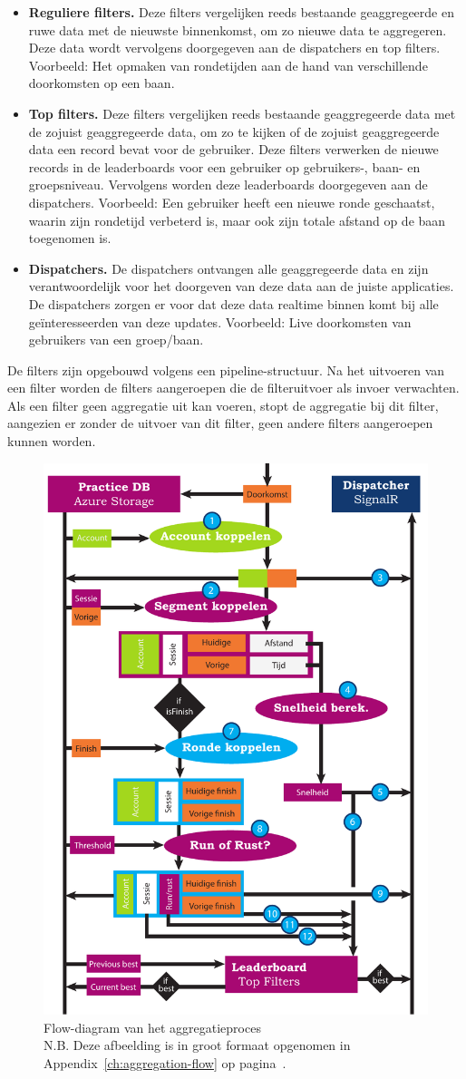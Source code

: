 \begin{itemize}
\item \textbf{Reguliere filters.}
Deze filters vergelijken reeds bestaande geaggregeerde en ruwe data met de nieuwste binnenkomst, om zo nieuwe data te aggregeren. Deze data wordt vervolgens doorgegeven aan de dispatchers en top filters. Voorbeeld: Het opmaken van rondetijden aan de hand van verschillende doorkomsten op een baan.
\item \textbf{Top filters.}
Deze filters vergelijken reeds bestaande geaggregeerde data met de zojuist geaggregeerde data, om zo te kijken of de zojuist geaggregeerde data een record bevat voor de gebruiker. Deze filters verwerken de nieuwe records in de leaderboards voor een gebruiker op gebruikers-, baan- en groepsniveau. Vervolgens worden deze leaderboards doorgegeven aan de dispatchers. Voorbeeld: Een gebruiker heeft een nieuwe ronde geschaatst, waarin zijn rondetijd verbeterd is, maar ook zijn totale afstand op de baan toegenomen is. 
\item \textbf{Dispatchers.}
De dispatchers ontvangen alle geaggregeerde data en zijn verantwoordelijk voor het doorgeven van deze data aan de juiste applicaties. De dispatchers zorgen er voor dat deze data realtime binnen komt bij alle geïnteresseerden van deze updates. 
Voorbeeld: Live doorkomsten van gebruikers van een groep/baan. 
\end{itemize}

De filters zijn opgebouwd volgens een pipeline-structuur. Na het uitvoeren van een filter worden de filters aangeroepen die de filteruitvoer als invoer verwachten. Als een filter geen aggregatie uit kan voeren, stopt de aggregatie bij dit filter, aangezien er zonder de uitvoer van dit filter, geen andere filters aangeroepen kunnen worden. 

\begin{figure}[h]
  \begin{center}
    \includegraphics[width=.4\textwidth]{style/images/Aggregatie-flow}
  \end{center}
  \caption{Flow-diagram van het aggregatieproces \\ N.B. Deze afbeelding is in groot formaat opgenomen in Appendix~\ref{ch:aggregation-flow} op pagina~\pageref{fig:aggregatie-flow-large}.}
  \label{fig:aggregatie-flow}
\end{figure}

